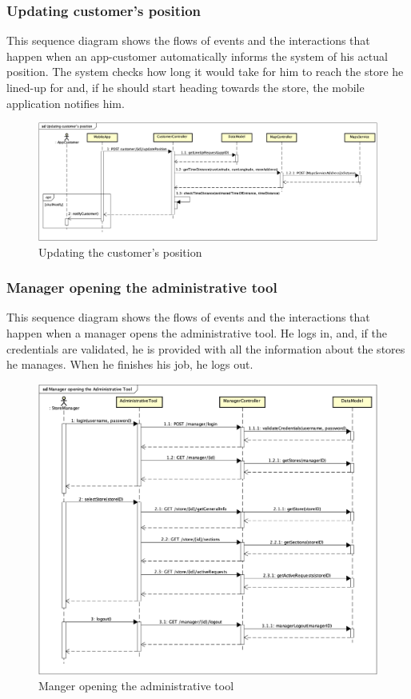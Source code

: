 \documentclass[a4paper,oneside,11pt]{book}
\begin{document}
    \subsubsection{Updating customer's position}
    This sequence diagram shows the flows of events and the interactions that happen when an app-customer automatically informs the system of his actual position. The system checks how long it would take for him to reach the store he lined-up for and, if he should start heading towards the store, the mobile application notifies him.
    \begin{figure}[H]
        \centering
        \includegraphics[width=\textwidth, height=\textheight, keepaspectratio]{pictures/sequence_diagrams/updating_customer_position}
        \caption{Updating the customer's position}
        \label{figure:updating_customer_position}
    \end{figure}
    \newpage
    \subsubsection{Manager opening the administrative tool}
    This sequence diagram shows the flows of events and the interactions that happen when a manager opens the administrative tool. He logs in, and, if the credentials are validated, he is provided with all the information about the stores he manages. When he finishes his job, he logs out.
    \begin{figure}[H]
        \centering
        \includegraphics[width=\textwidth, height=\textheight, keepaspectratio]{pictures/sequence_diagrams/manager_opening_the_administrative_tool}
        \caption{Manger opening the administrative tool}
        \label{figure:manager_opening_the_administrative_tool}
    \end{figure}
    \newpage
\end{document}
